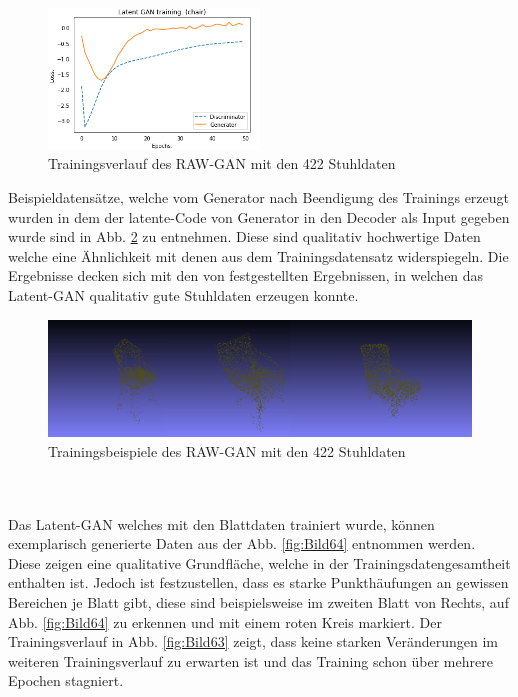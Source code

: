 \documentclass{llncs}
\begin{document}
\begin{figure}[htbp] 
	\centering
	\includegraphics[width=0.5\textwidth]{latent_gan_chair_result.png}
	\caption{Trainingsverlauf des RAW-GAN mit den 422 Stuhldaten}
	\label{fig:Bild61}
\end{figure}
Beispieldatensätze, welche vom Generator nach Beendigung des Trainings erzeugt wurden in dem der latente-Code von Generator in den Decoder als Input gegeben wurde sind in Abb. \ref{fig:Bild62} zu entnehmen. Diese sind qualitativ hochwertige Daten welche eine Ähnlichkeit mit denen aus dem Trainingsdatensatz widerspiegeln. Die Ergebnisse decken sich mit den von \cite{3dgan} festgestellten Ergebnissen, in welchen das Latent-GAN qualitativ gute Stuhldaten erzeugen konnte. 
\begin{figure}[htbp] 
	\centering
	\includegraphics[width=1.0\textwidth]{latent_gan_chair_example.png}
	\caption{Trainingsbeispiele des RAW-GAN mit den 422 Stuhldaten}
	\label{fig:Bild62}
\end{figure}
~\\\\
Das Latent-GAN welches mit den Blattdaten trainiert wurde, können exemplarisch generierte Daten aus der Abb. \ref{fig:Bild64} entnommen werden. Diese zeigen eine qualitative Grundfläche, welche in der Trainingsdatengesamtheit enthalten ist. Jedoch ist festzustellen, dass es starke Punkthäufungen an gewissen Bereichen je Blatt gibt, diese sind beispielsweise im zweiten Blatt von Rechts, auf Abb. \ref{fig:Bild64} zu erkennen und mit einem roten Kreis markiert. Der Trainingsverlauf in Abb. \ref{fig:Bild63} zeigt, dass keine starken Veränderungen im weiteren Trainingsverlauf zu erwarten ist und das Training schon über mehrere Epochen stagniert.
\end{document}
